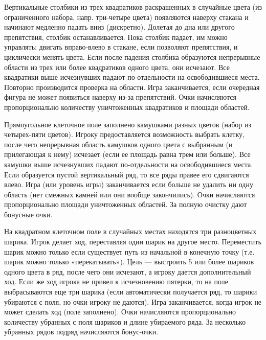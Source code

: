 \begin{zztask}[Columns]
Вертикальные столбики из трех квадратиков раскрашенных в случайные цвета (из
ограниченного набора, напр. три-четыре цвета) появляются наверху стакана и
начинают медленно падать вниз (дискретно). Долетая до дна или другого
препятствия, столбик останавливается. Пока столбик падает, им можно управлять:
двигать вправо-влево в стакане, если позволяют препятствия, и циклически
менять цвета. Если после падения столбика образуются непрерывные области из
трех или более квадратиков одного цвета, они исчезают. Все квадратики выше
исчезнувших падают по-отдельности на освободившиеся места. Повторно
производится проверка на области. Игра заканчивается, если очередная фигура не
может появиться наверху из-за препятствий. Очки начисляются пропорционально
количеству уничтоженных квадратиков и площади областей.
\end{zztask}


\begin{zztask}[Gems]
Прямоугольное клеточное поле заполнено камушками разных цветов (набор из
четырех-пяти цветов). Игроку предоставляется возможность выбрать клетку, после
чего непрерывная область камушков одного цвета с выбранным (и прилегающая к
нему) исчезает (если ее площадь равна трем или больше). Все камушки выше
исчезнувших падают по-отдельности на освободившиеся места. Если образуется
пустой вертикальный ряд, то все ряды правее его сдвигаются влево. Игра (или
уровень игры) заканчивается если больше не удалить ни одну область (нет
смежных камней или они вообще закончились). Очки начисляются пропорционально
площади уничтоженных областей. За полную очистку дают бонусные очки.
\end{zztask}


\begin{zztask}[Lines]
На квадратном клеточном поле в случайных местах находятся три разноцветных
шарика. Игрок делает ход, переставляя один шарик на другое место. Переместить
шарик можно только если существует путь из начальной в конечную точку (т.е.
шарик можно только «перекатывать»). Цель — выстроить 5 или более шариков
одного цвета в ряд, после чего они исчезают, а игроку дается дополнительный
ход. Если же ход игрока не привел к исчезновению пятерки, то на поле
выбрасываются еще три шарика (если автоматически получается ряд, то шарики
убираются с поля, но очки игроку не даются). Игра заканчивается, когда игрок
не может сделать ход (поле заполнено). Очки начисляются пропорционально
количеству убранных с поля шариков и длине убираемого ряда. За несколько
убранных рядов подряд начисляются бонус-очки.
\end{zztask}

